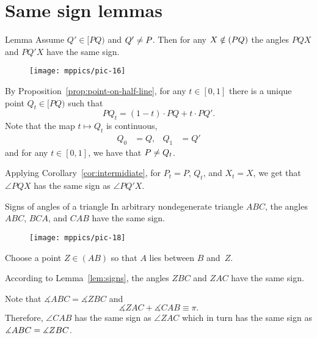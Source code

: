 \section{Same sign lemmas}



\begin{thm}[\abs]{Lemma}\label{lem:signs}
Assume $Q'\in [PQ)$ and $Q'\ne P$.
Then for any $X\notin (PQ)$ the angles $PQX$ and $PQ'X$ have the same sign. 
\end{thm}

{

\begin{wrapfigure}{o}{33mm}
\centering
\vskip-5mm
\texttt{[image: mppics/pic-16]}
\end{wrapfigure}

By Proposition~\ref{prop:point-on-half-line},
for any $t\in [0,1]$ there is a unique point $Q_t\in[PQ)$ 
such that 
\[PQ_t=  (1-t)\cdot PQ+t\cdot PQ'.\]
Note that the map $t\mapsto Q_t$ is continuous,
\begin{align*}
Q_0&=Q,
&
Q_1&=Q'
\end{align*}
and for any $t\in [0,1]$, 
we have that $P\ne Q_t$.

}

Applying Corollary~\ref{cor:intermidiate},
for $P_t=P$, $Q_t$, and $X_t=X$, we get that $\angle PQX$ has the same sign as $\angle PQ'X$.
\qeds



\begin{thm}[\abs]{Signs of angles of a triangle}\label{thm:signs-of-triug}
In arbitrary nondegenerate triangle $ABC$,
the angles $ABC$, $BCA$, and $CAB$ have the same sign. 
\end{thm}

{

\begin{wrapfigure}{o}{33mm}
\vskip-4mm
\centering
\texttt{[image: mppics/pic-18]}
\end{wrapfigure}

Choose a point $Z\in (AB)$ so that $A$ lies between $B$ and~$Z$.


According to Lemma~\ref{lem:signs},
the angles $ZBC$ and $ZAC$ have the same sign.


Note that $\measuredangle ABC=\measuredangle ZBC$
and 
$$\measuredangle ZAC+\measuredangle CAB\equiv \pi.$$
Therefore, $\angle CAB$ has the same sign as $\angle ZAC$
which in turn has the same sign as $\measuredangle ABC=\measuredangle ZBC$.

}

